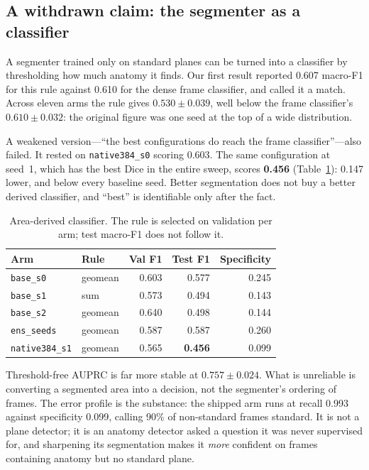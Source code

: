 \documentclass[conference]{IEEEtran}
\begin{document}
\subsection{A withdrawn claim: the segmenter as a classifier}
\label{sec:derived}

A segmenter trained only on standard planes can be turned into a classifier by
thresholding how much anatomy it finds. Our first result reported 0.607
macro-F1 for this rule against 0.610 for the dense frame classifier, and called
it a match. Across eleven arms the rule gives $0.530\pm0.039$, well below the
frame classifier's $0.610\pm0.032$: the original figure was one seed at the top
of a wide distribution.

A weakened version---``the best configurations do reach the frame
classifier''---also failed. It rested on \texttt{native384\_s0} scoring 0.603.
The same configuration at seed~1, which has the best Dice in the entire sweep,
scores \textbf{0.456} (Table~\ref{tab:derived}): 0.147 lower, and below every
baseline seed. Better segmentation does not buy a better derived classifier,
and ``best'' is identifiable only after the fact.

\begin{table}[t]
\caption{Area-derived classifier. The rule is selected on validation per arm;
test macro-F1 does not follow it.}
\label{tab:derived}
\centering
\begin{tabular}{llrrr}
\toprule
Arm & Rule & Val F1 & Test F1 & Specificity \\
\midrule
\texttt{base\_s0} & geomean & 0.603 & 0.577 & 0.245 \\
\texttt{base\_s1} & sum & 0.573 & 0.494 & 0.143 \\
\texttt{base\_s2} & geomean & 0.640 & 0.498 & 0.144 \\
\texttt{ens\_seeds} & geomean & 0.587 & 0.587 & 0.260 \\
\texttt{native384\_s1} & geomean & 0.565 & \textbf{0.456} & 0.099 \\
\bottomrule
\end{tabular}
\end{table}

Threshold-free AUPRC is far more stable at $0.757\pm0.024$. What is unreliable
is converting a segmented area into a decision, not the segmenter's ordering of
frames. The error profile is the substance: the shipped arm runs at recall
0.993 against specificity 0.099, calling 90\% of non-standard frames standard.
It is not a plane detector; it is an anatomy detector asked a question it was
never supervised for, and sharpening its segmentation makes it \emph{more}
confident on frames containing anatomy but no standard plane.
\end{document}
